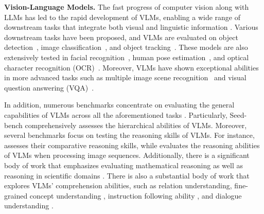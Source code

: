 \textbf{Vision-Language Models.} The fast progress of computer vision along with LLMs has led to the rapid development of VLMs, enabling a wide range of downstream tasks that integrate both visual and linguistic information \cite{li2024survey, huang2024survey}. Various downstream tasks have been proposed, and VLMs are evaluated on object detection~\cite{chen2024taskclip}, image classification~\cite{Kirillov2023SegmentA}, and object tracking~\cite{wu2024single}. These models are also extensively tested in facial recognition~\cite{foteinopoulou2024emoclip}, human pose estimation~\cite{feng2024chatpose}, and optical character recognition (OCR)~\cite{jiao2024enhancing}. Moreover, VLMs have shown exceptional abilities in more advanced tasks such as multiple image scene recognition~\cite{jin2024chat, chen2024lion} and visual question answering (VQA)~\cite{ganz2024question, lee2024visual}. 

In addition, numerous benchmarks concentrate on evaluating the general capabilities of VLMs across all the aforementioned tasks \cite{villa2023behind, chen2024we, liu2023mmbench, li2024seed, song2024milebench, wu2023q, yin2024lamm, liu2024visual, fu2023mme, li2024seedplus}. Particularly, Seed-bench \cite{li2024seed} comprehensively assesses the hierarchical abilities of VLMs. Moreover, several benchmarks focus on testing the reasoning skills of VLMs. 
For instance, \cite{kil2024compbench} assesses their comparative reasoning skills, while \cite{wang2024mementos} evaluates the reasoning abilities of VLMs when processing image sequences. Additionally, there is a significant body of work that emphasizes evaluating mathematical reasoning as well as reasoning in scientific domains \cite{yue2024mmmu, yue2024mmmupro, zhang2024cmmmu, Liang2024SceMQAAS, lu2023mathvista, xiao2024logicvista, zhang2023m3exam}. There is also a substantial body of work that explores VLMs' comprehension abilities, such as relation understanding\cite{nie2024mmrel}, fine-grained concept understanding \cite{peng2024synthesize}, instruction following ability \cite{qian2024mia, li2023empowering}, and dialogue understanding \cite{liu2024mmdu}.

